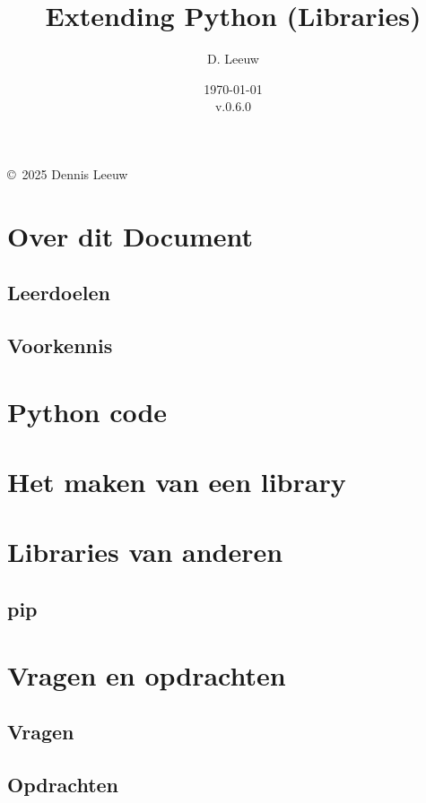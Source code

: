 \documentclass[a4paper,12pt,twoside,openright,titlepage]{book}
\author{D. Leeuw}
\title{Extending Python (Libraries)}
\date{\today\\v.0.6.0}
\begin{document}

\maketitle

\copyright\ 2025 Dennis Leeuw\\




\frontmatter
\chapter{Over dit Document}
\section{Leerdoelen}

\section{Voorkennis}


\tableofcontents

\mainmatter

\chapter{Python code}


\chapter{Het maken van een library}


\chapter{Libraries van anderen}

\section{pip}


\chapter{Vragen en opdrachten}
\section{Vragen}

\section{Opdrachten}


\printindex
\end{document}
